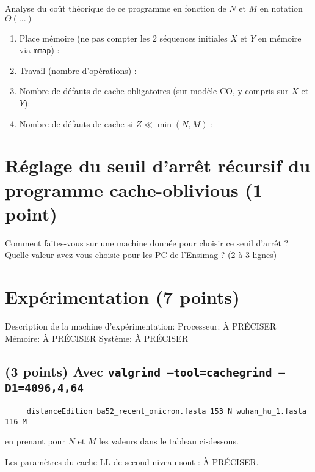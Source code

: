 \documentclass[10pt,a4paper]{article}
\begin{document}
{Analyse du coût théorique de ce programme en fonction de $N$ et $M$ en notation $\Theta(...)$
\begin{enumerate}
  \item Place mémoire (ne pas compter les 2 séquences initiales $X$ et $Y$ en mémoire via {\tt mmap}) :
  \item Travail (nombre d'opérations) :
  \item Nombre de défauts de cache obligatoires (sur modèle CO, y compris sur $X$ et $Y$):
  \item Nombre de défauts de cache si $Z \ll \min(N,M)$ :
\end{enumerate}

\section{Réglage du seuil d'arrêt récursif du programme cache-oblivious (1 point)}
Comment faites-vous sur une machine donnée pour choisir ce seuil d'arrêt ? Quelle valeur avez-vous choisie pour les PC de l'Ensimag ? (2 à 3 lignes)

\section{Expérimentation (7 points)}

Description de la machine d'expérimentation:
Processeur: À PRÉCISER
Mémoire: À PRÉCISER
Système: À PRÉCISER

\subsection{(3 points) Avec {\tt valgrind --tool=cachegrind --D1=4096,4,64}}
\begin{verbatim}
     distanceEdition ba52_recent_omicron.fasta 153 N wuhan_hu_1.fasta 116 M
\end{verbatim}
en prenant pour $N$ et $M$ les valeurs dans le tableau ci-dessous.

Les paramètres du cache LL de second niveau sont : À PRÉCISER.

}
\end{document}
